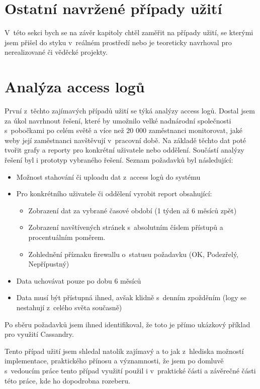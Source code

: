 \section{Ostatní navržené případy užití}

V~této sekci bych se na závěr kapitoly chtěl zaměřit na případy užití, se kterými jsem přišel do styku v~reálném prostředí nebo je teoreticky navrhoval pro nerealizované či věděcké projekty. 

\section{Analýza access logů}
První z~těchto zajímavých případů užití se týká analýzy access logů. Dostal jsem za úkol navrhnout řešení, které by umožnilo velké nadnárodní společnosti s~pobočkami po celém světě a více než 20 000 zaměstnanci monitorovat, jaké weby její zaměstnanci navštěvují v~pracovní době. Na základě těchto dat poté tvořit grafy a reporty pro konkrétní uživatele nebo oddělení. Součástí analýzy řešení byl i prototyp vybraného řešení. Seznam požadavků byl následující: 

\begin{itemize}
\item Možnost stahování či uploadu dat z~access logů do systému
\item Pro konkrétního uživatele či oddělení vyrobit report obsahující:
\begin{itemize}
\item Zobrazení dat za vybrané časové období (1 týden až 6 měsíců zpět) 
\item Zobrazení navštívených stránek s~absolutním číslem přístupů a procentuálním poměrem. 
\item Zohlednění příznaku firewallu o~statusu požadavku (OK, Podezřelý, Nepřípustný)  
\end{itemize}
\item Data uchovávat pouze po dobu 6 měsíců 
\item Data musí být přístupná ihned, avšak klidně s~denním zpožděním (logy se nestahují z~celého světa současně)
\end{itemize}

Po sběru požadavků jsem ihned identifikoval, že toto je přímo ukázkový příklad pro využití Cassandry. 

Tento případ užití jsem shledal natolik zajímavý a to jak z~hlediska možností implementace, praktického přínosu a významnosti, že jsem po domluvě s~vedoucím práce tento případ využití použil i v~praktické části a závěrečné části této práce, kde ho dopodrobna rozeberu.

